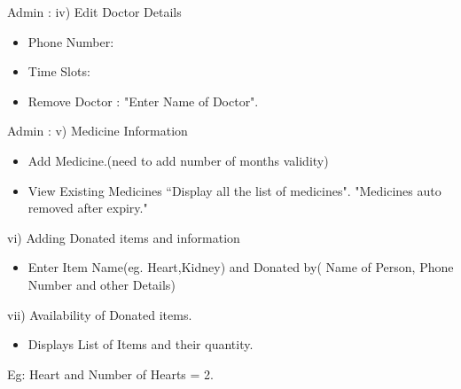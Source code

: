 \documentclass{beamer}
\begin{document}
%
\begin{frame}{Admin : iv) Edit Doctor Details}
\begin{itemize}
\item Phone Number:
\item Time Slots:
\item Remove Doctor : "Enter Name of Doctor".
\end{itemize}
\end{frame}
%
\begin{frame}{Admin : v) Medicine Information}
\begin{itemize}
\item Add Medicine.(need to add number of months validity)
\item View Existing Medicines {“Display all the list of medicines"}.
"Medicines auto removed after expiry."
\end{itemize}
\end{frame}
%
\begin{frame}{vi) Adding Donated items and information}
\begin{itemize}
\item Enter Item Name(eg. Heart,Kidney) and Donated by( Name of Person, Phone Number and other Details)
\end{itemize}
\end{frame}
%
\begin{frame}{vii) Availability of Donated items.}
\begin{itemize}
\item Displays List of Items and their quantity.
\end{itemize}
Eg: Heart and Number of Hearts = 2.
\end{frame}
\end{document}
